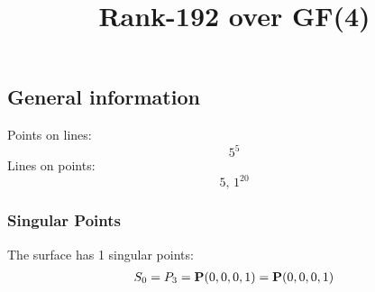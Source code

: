 \documentclass{article}
\newcommand\setTBstruts{\def\T{\rule{0pt}{2.6ex}}%
\def\B{\rule[-1.2ex]{0pt}{0pt}}}
\newcommand{\bP}{{\bf P}}
\begin{document}
 
\setTBstruts



{\allowdisplaybreaks%






\title{Rank-192 over GF(4)}
\author{}%
\maketitle%
%
{}



\subsection*{General information}
Points on lines:
$$
5^5$$
Lines on points:
$$
5,\,1^{20}$$
\subsubsection*{Singular Points}
The surface has 1 singular points:\\
\begin{align*}
S_{0} &= P_{3}=\bP(0, 0, 0, 1) = \bP(0, 0, 0, 1)\\
\end{align*}
}
\end{document}
